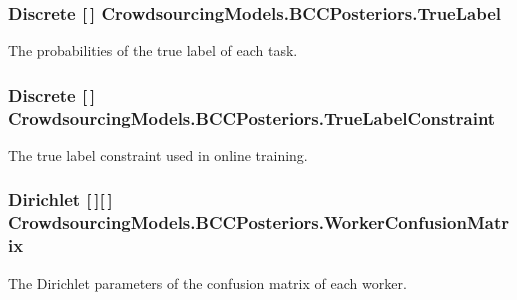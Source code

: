 \subsubsection[{True\+Label}]{\setlength{\rightskip}{0pt plus 5cm}Discrete \mbox{[}$\,$\mbox{]} Crowdsourcing\+Models.\+B\+C\+C\+Posteriors.\+True\+Label}\label{class_crowdsourcing_models_1_1_b_c_c_posteriors_ab5020db40be02d3dedd50d61371e84c8}


The probabilities of the true label of each task. 

\hypertarget{class_crowdsourcing_models_1_1_b_c_c_posteriors_ac3b5fc60bf5d2a625a7638bf5af91474}{}
\subsubsection[{True\+Label\+Constraint}]{\setlength{\rightskip}{0pt plus 5cm}Discrete \mbox{[}$\,$\mbox{]} Crowdsourcing\+Models.\+B\+C\+C\+Posteriors.\+True\+Label\+Constraint}\label{class_crowdsourcing_models_1_1_b_c_c_posteriors_ac3b5fc60bf5d2a625a7638bf5af91474}


The true label constraint used in online training. 

\hypertarget{class_crowdsourcing_models_1_1_b_c_c_posteriors_ab9ba40964b3fa2c9c349282dafa79fbb}{}
\subsubsection[{Worker\+Confusion\+Matrix}]{\setlength{\rightskip}{0pt plus 5cm}Dirichlet \mbox{[}$\,$\mbox{]}\mbox{[}$\,$\mbox{]} Crowdsourcing\+Models.\+B\+C\+C\+Posteriors.\+Worker\+Confusion\+Matrix}\label{class_crowdsourcing_models_1_1_b_c_c_posteriors_ab9ba40964b3fa2c9c349282dafa79fbb}


The Dirichlet parameters of the confusion matrix of each worker. 

\hypertarget{class_crowdsourcing_models_1_1_b_c_c_posteriors_a2bf09db28d0e9cdf9c6816c9e798ec95}{}
